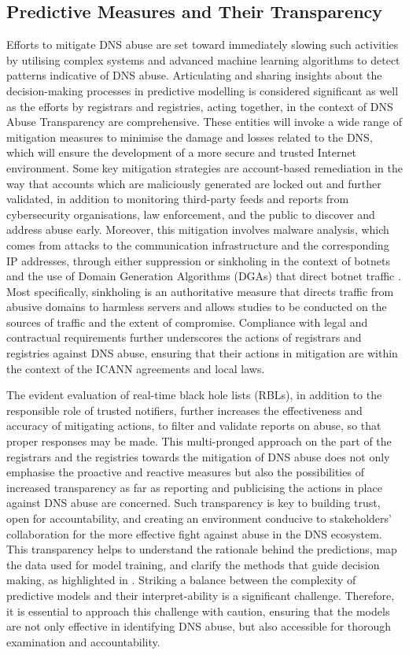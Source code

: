 \subsection{Predictive Measures and Their Transparency}

Efforts to mitigate DNS abuse are set toward immediately slowing such activities by utilising complex systems and advanced machine learning algorithms to detect patterns indicative of DNS abuse. Articulating and sharing insights about the decision-making processes in predictive modelling is considered significant as well as the efforts by registrars and registries, acting together, in the context of DNS Abuse Transparency are comprehensive. These entities will invoke a wide range of mitigation measures to minimise the damage and losses related to the DNS, which will ensure the development of a more secure and trusted Internet environment. Some key mitigation strategies are account-based remediation in the way that accounts which are maliciously generated are locked out and further validated, in addition to monitoring third-party feeds and reports from cybersecurity organisations, law enforcement, and the public to discover and address abuse early. Moreover, this mitigation involves malware analysis, which comes from attacks to the communication infrastructure and the corresponding IP addresses, through either suppression or sinkholing in the context of botnets and the use of Domain Generation Algorithms (DGAs) that direct botnet traffic \cite{ M3AAWG2024}. Most specifically, sinkholing is an authoritative measure that directs traffic from abusive domains to harmless servers and allows studies to be conducted on the sources of traffic and the extent of compromise. Compliance with legal and contractual requirements further underscores the actions of registrars and registries against DNS abuse, ensuring that their actions in mitigation are within the context of the ICANN agreements and local laws. 

The evident evaluation of real-time black hole lists (RBLs), in addition to the responsible role of trusted notifiers, further increases the effectiveness and accuracy of mitigating actions, to filter and validate reports on abuse, so that proper responses may be made. This multi-pronged approach on the part of the registrars and the registries towards the mitigation of DNS abuse does not only emphasise the proactive and reactive measures but also the possibilities of increased transparency as far as reporting and publicising the actions in place against DNS abuse are concerned. Such transparency is key to building trust, open for accountability, and creating an environment conducive to stakeholders' collaboration for the more effective fight against abuse in the DNS ecosystem. This transparency helps to understand the rationale behind the predictions, map the data used for model training, and clarify the methods that guide decision making, as highlighted in \cite{hussain2022software}. Striking a balance between the complexity of predictive models and their interpret-ability is a significant challenge. Therefore, it is essential to approach this challenge with caution, ensuring that the models are not only effective in identifying DNS abuse, but also accessible for thorough examination and accountability.

